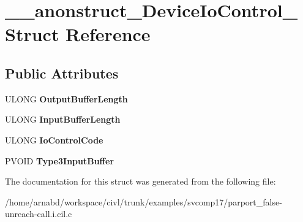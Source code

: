 \hypertarget{struct____anonstruct__DeviceIoControl__64}{}\section{\+\_\+\+\_\+anonstruct\+\_\+\+Device\+Io\+Control\+\_ Struct Reference}
\label{struct____anonstruct__DeviceIoControl__64}
\subsection*{Public Attributes}
\begin{DoxyCompactItemize}
\item 
\hypertarget{struct____anonstruct__DeviceIoControl__64_aebabb8b8102eb272e8eb3f133ab03f5f}{}U\+L\+O\+N\+G {\bfseries Output\+Buffer\+Length}\label{struct____anonstruct__DeviceIoControl__64_aebabb8b8102eb272e8eb3f133ab03f5f}

\item 
\hypertarget{struct____anonstruct__DeviceIoControl__64_a96f2030b2b52185661405dc6ae210c93}{}U\+L\+O\+N\+G {\bfseries Input\+Buffer\+Length}\label{struct____anonstruct__DeviceIoControl__64_a96f2030b2b52185661405dc6ae210c93}

\item 
\hypertarget{struct____anonstruct__DeviceIoControl__64_aa802ff3843a4cdfba4b48b27923568d2}{}U\+L\+O\+N\+G {\bfseries Io\+Control\+Code}\label{struct____anonstruct__DeviceIoControl__64_aa802ff3843a4cdfba4b48b27923568d2}

\item 
\hypertarget{struct____anonstruct__DeviceIoControl__64_a5331f2b7cacbf6304d705628db153c8d}{}P\+V\+O\+I\+D {\bfseries Type3\+Input\+Buffer}\label{struct____anonstruct__DeviceIoControl__64_a5331f2b7cacbf6304d705628db153c8d}

\end{DoxyCompactItemize}


The documentation for this struct was generated from the following file\+:\begin{DoxyCompactItemize}
\item 
/home/arnabd/workspace/civl/trunk/examples/svcomp17/parport\+\_\+false-\/unreach-\/call.\+i.\+cil.\+c\end{DoxyCompactItemize}
